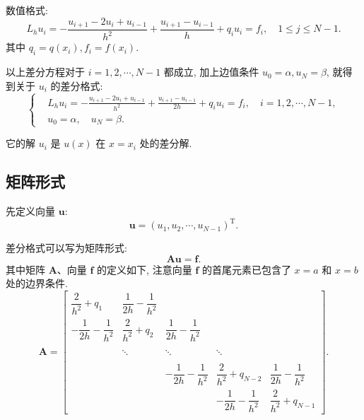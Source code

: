 \documentclass[UTF8,openany,twoside,12pt]{book}
\theoremstyle{plain}
\begin{document}
数值格式:
\begin{equation*}
  L_{h} u_{i}=-\frac{u_{i+1}-2 u_{i}+u_{i-1}}{h^{2}}+\frac{u_{i+1}-u_{i-1}}{h}+q_{i} u_{i}=f_{i},\quad 1 \leqslant j \leqslant N-1.
\end{equation*}
其中  $q_{i}=q(x_{i}), f_{i}=f(x_{i})$.

以上差分方程对于 $i=1,2, \cdots, N-1$ 都成立, 加上边值条件 $u_{0}=\alpha, u_{N}=\beta$, 就得到关于 $u_i$ 的差分格式:
\begin{equation}\label{eqn:fdm}
\left\{\begin{aligned}
& L_{h} u_{i}=-\frac{u_{i+1}-2 u_{i}+u_{i-1}}{h^{2}}+\frac{u_{i+1}-u_{i-1}}{2h}+q_{i} u_{i}=f_{i}, \quad i=1,2, \cdots, N-1, \\
& u_{0}=\alpha, \quad u_{N}=\beta.
\end{aligned}\right.
\end{equation}

它的解 $u_i$ 是 $u(x)$ 在 $x=x_i$ 处的差分解.


\subsection{矩阵形式}

先定义向量 $\boldsymbol{u}$:
\begin{equation*}
  \boldsymbol{u}=(u_{1}, u_{2}, \cdots, u_{N-1})^{\mathrm{T}}.
\end{equation*}

差分格式可以写为矩阵形式:
\begin{equation*}
  \boldsymbol{A}\boldsymbol{u}=\boldsymbol{f}.
\end{equation*}
其中矩阵 $\boldsymbol{A}$、向量 $\boldsymbol{f}$ 的定义如下, 注意向量 $\boldsymbol{f}$ 的首尾元素已包含了 $x=a$ 和 $x=b$ 处的边界条件.
\begin{equation}\label{equ:matrix1}
\boldsymbol{A}=\begin{bmatrix}
\dfrac{2}{h^{2}}+q_{1} & \dfrac{1}{2h}-\dfrac{1}{h^{2}} &   &  &  \\[8pt]
 -\dfrac{1}{2h}-\dfrac{1}{h^{2}} & \dfrac{2}{h^{2}}+q_{2} & \dfrac{1}{2h}-\dfrac{1}{h^{2}}  & &  \\[8pt]
  &  &  &  &    \\
   &  \ddots  & \ddots  &  \ddots  &  \\[8pt]
   &  &  &  &    \\
  &   & -\dfrac{1}{2h}-\dfrac{1}{h^{2}} & \dfrac{2}{h^{2}}+q_{N-2}& \dfrac{1}{2h}-\dfrac{1}{h^{2}} \\[8pt]
  &  &  & -\dfrac{1}{2h}-\dfrac{1}{h^{2}} & \dfrac{2}{h^{2}}+q_{N-1}
\end{bmatrix}.
\end{equation}
\end{document}
